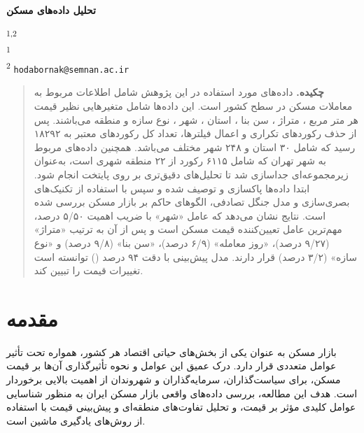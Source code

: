 \documentclass[twoside,reqno]{amsart}
\begin{document}
    \thispagestyle{empty}

    \pagestyle{myheadings}
    \def\n{\noindent}%

    \def\mapdown#1{\Big\downarrow\rlap
    {$\vcenter{\hbox{$\scriptstyle#1$}}$}}
    

    \setcounter{page}{1} \noindent


    \vspace{1.5cm}
    \begin{center}
    {\Large \bf تحلیل داده‌های مسکن}\\
    \vspace{0.5cm}

    \textsuperscript{1,2}\\
    \vspace{0.1cm}
    \textsuperscript{1} \\
    \vspace{0.1cm}
    \textsuperscript{2} \texttt{hodabornak@semnan.ac.ir}

    \end{center}
    \vspace*{0.5cm}
    \begin{quotation}
    \noindent
    {\footnotesize
    \textbf{چکیده.}
 داده‌های مورد استفاده در این پژوهش شامل اطلاعات مربوط به معاملات مسکن در سطح کشور است. این داده‌ها شامل متغیرهایی نظیر قیمت هر متر مربع ، متراژ ، سن بنا ، استان ، شهر ، نوع سازه  و  منطقه  می‌باشند.
پس از حذف رکوردهای تکراری و اعمال فیلترها، تعداد کل رکوردهای معتبر به ۱۸۲۹۲ رسید که شامل ۳۰ استان و  ۲۴۸ شهر مختلف می‌باشد. همچنین داده‌های مربوط به شهر تهران که شامل ۶۱۱۵ رکورد از ۲۲ منطقه شهری است، به‌عنوان زیرمجموعه‌ای جداسازی شد تا تحلیل‌های دقیق‌تری بر روی پایتخت انجام شود.
ابتدا داده‌ها پاکسازی و توصیف شده و سپس با استفاده از تکنیک‌های بصری‌سازی  و مدل جنگل تصادفی، الگوهای حاکم بر بازار مسکن بررسی شده است. نتایج نشان می‌دهد که عامل «شهر» با ضریب اهمیت ۵/۵۰ درصد، مهم‌ترین عامل تعیین‌کننده قیمت مسکن است و پس از آن به ترتیب «متراژ» (۹/۲۷ درصد)، «روز معامله» (۶/۹ درصد)، «سن بنا» (۹/۸ درصد) و «نوع سازه» (۳/۲ درصد) قرار دارند. مدل پیش‌بینی با دقت ۹۴ درصد () توانسته است تغییرات قیمت را تبیین کند.
 
    }
    \end{quotation}
    
\section{مقدمه}
بازار مسکن به عنوان یکی از بخش‌های حیاتی اقتصاد هر کشور، همواره تحت تأثیر عوامل متعددی قرار دارد. درک عمیق این عوامل و نحوه تأثیرگذاری آن‌ها بر قیمت مسکن، برای سیاست‌گذاران، سرمایه‌گذاران و شهروندان از اهمیت بالایی برخوردار است. هدف این مطالعه، بررسی داده‌های واقعی بازار مسکن ایران به منظور شناسایی عوامل کلیدی مؤثر بر قیمت، و تحلیل تفاوت‌های منطقه‌ای و پیش‌بینی قیمت با استفاده از روش‌های یادگیری ماشین است.
\end{document}
